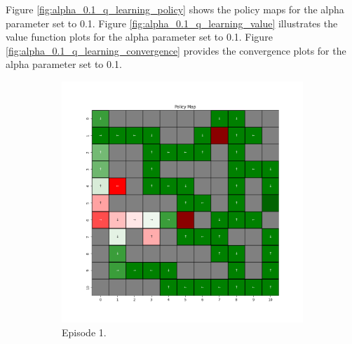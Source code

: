 \documentclass{assignment}
\begin{document}
Figure \ref{fig:alpha_0.1_q_learning_policy} shows the policy maps for the alpha parameter set to 0.1. Figure \ref{fig:alpha_0.1_q_learning_value} illustrates the value function plots for the alpha parameter set to 0.1. Figure \ref{fig:alpha_0.1_q_learning_convergence} provides the convergence plots for the alpha parameter set to 0.1.

\begin{figure}[H]
    \begin{subfigure}{0.3\textwidth}
        \includegraphics[width=\textwidth]{figures/policy_q/alpha_sweep/policy_alpha_0.1_gamma_0.95_epsilon_0.2_iteration_1.png}
    \caption{Episode 1.}
    \end{subfigure}\hfill
    \begin{subfigure}{0.3\textwidth}

\end{subfigure}
\end{figure}
\end{document}
